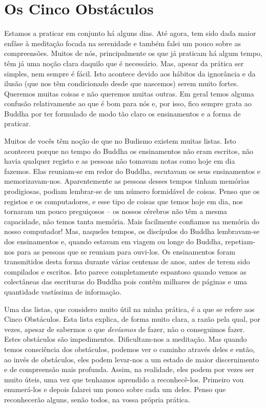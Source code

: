 \chapter{Os Cinco Obstáculos}

Estamos a praticar em conjunto há alguns dias. Até agora, tem sido dada
maior enfâse à meditação focada na serenidade e também falei um pouco
sobre as compreensões. Muitos de nós, principalmente os que já praticam
há algum tempo, têm já uma noção clara daquilo que é necessário. Mas,
apesar da prática ser simples, nem sempre é fácil. Isto acontece devido
aos hábitos da ignorância e da ilusão (que nos têm condicionado desde
que nascemos) serem muito fortes. Queremos muitas coisas e não queremos
muitas outras. Em geral temos alguma confusão relativamente ao que é bom
para nós e, por isso, fico sempre grata ao Buddha por ter formulado de
modo tão claro os ensinamentos e a forma de praticar.

Muitos de vocês têm noção de que no Budismo existem muitas listas. Isto
aconteceu porque no tempo do Buddha os ensinamentos não eram escritos,
não havia qualquer registo e as pessoas não tomavam notas como hoje em
dia fazemos. Elas reuniam-se em redor do Buddha, escutavam os seus
ensinamentos e memorizavam-nos. Aparentemente as pessoas desses tempos
tinham memórias prodigiosas, podiam lembrar-se de um número formidável
de coisas. Penso que os registos e os computadores, e esse tipo de
coisas que temos hoje em dia, nos tornaram um pouco preguiçosos -- os
nossos cérebros não têm a mesma capacidade, não temos tanta memória.
Mais facilmente confiamos na memória do nosso computador! Mas, naqueles
tempos, os discípulos do Buddha lembravam-se dos ensinamentos e, quando
estavam em viagem ou longe do Buddha, repetiam-nos para as pessoas que
se reuniam para ouvi-los. Os ensinamentos foram transmitidos desta forma
durante várias centenas de anos, antes de terem sido compilados e
escritos. Isto parece completamente espantoso quando vemos as
colectâneas das escrituras do Buddha pois contêm milhares de páginas e
uma quantidade vastíssima de informação.

Uma das listas, que considero muito útil na minha prática, é a que se
refere aos Cinco Obstáculos. Esta lista explica, de forma muito clara, a
razão pela qual, por vezes, apesar de sabermos o que \emph{devíamos} de
fazer, não o conseguimos fazer. Estes obstáculos são impedimentos.
Dificultam-nos a meditação. Mas quando temos consciência dos obstáculos,
podemos ver o caminho através deles e então, ao invés de obstáculos,
eles podem levar-nos a um estado de maior discernimento e de compreensão
mais profunda. Assim, na realidade, eles podem por vezes ser muito
úteis, uma vez que tenhamos aprendido a reconhecê-los. Primeiro vou
enumerá-los e depois falarei um pouco sobre cada um deles. Penso que
reconhecerão alguns, senão todos, na vossa própria prática.

